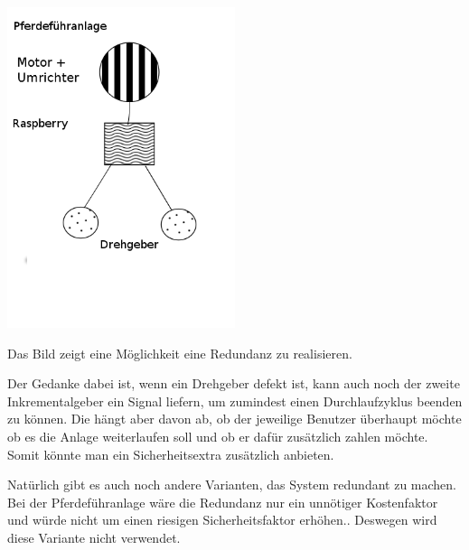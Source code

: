 \begin{center}
	\includegraphics[width=0.5\textwidth]{Redundanz}
\end{center}

Das Bild zeigt eine Möglichkeit eine Redundanz zu realisieren.

Der Gedanke dabei ist, wenn ein Drehgeber defekt ist, kann auch noch der zweite Inkrementalgeber ein Signal liefern, um zumindest einen Durchlaufzyklus beenden zu können. Die hängt aber davon ab, ob der jeweilige Benutzer überhaupt möchte ob es die Anlage weiterlaufen soll und ob er dafür zusätzlich zahlen möchte. Somit könnte man ein Sicherheitsextra zusätzlich anbieten.

Natürlich gibt es auch noch andere Varianten, das System redundant zu machen.
Bei der Pferdeführanlage wäre die Redundanz nur ein unnötiger Kostenfaktor und würde nicht um einen riesigen Sicherheitsfaktor erhöhen..
Deswegen wird diese Variante nicht verwendet.

\newpage

